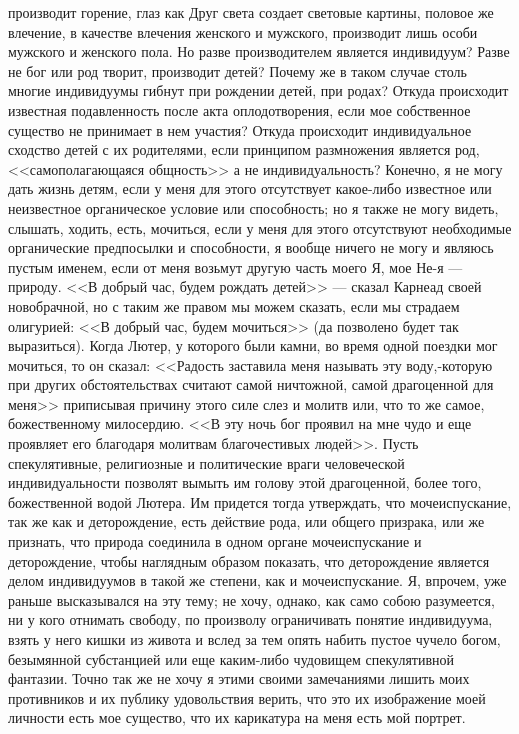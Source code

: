 \documentclass[12pt]{article}
\begin{document}
производит горение, глаз как Друг света создает световые картины, половое же влечение, в качестве влечения женского и мужского, производит лишь особи мужского и женского пола. Но разве производителем является индивидуум? Разве не бог или род творит, производит детей? Почему же в таком случае столь многие индивидуумы гибнут при рождении детей, при родах? Откуда происходит известная подавленность после акта оплодотворения, если мое собственное существо не принимает в нем участия? Откуда происходит индивидуальное сходство детей с их родителями, если принципом размножения является род, <<самополагающаяся общность>>  а не индивидуальность? Конечно, я не могу дать жизнь детям, если у меня для этого отсутствует какое-либо известное или неизвестное органическое условие или способность; но я также не могу видеть, слышать, ходить, есть, мочиться, если у меня для этого отсутствуют необходимые органические предпосылки и способности, я вообще ничего не могу и являюсь пустым именем, если от меня возьмут другую часть моего Я, мое Не-я --- природу. <<В добрый час, будем рождать детей>>  --- сказал Карнеад своей новобрачной, но с таким же правом мы можем сказать, если мы страдаем олигурией: <<В добрый час, будем мочиться>> (да позволено будет так выразиться). Когда Лютер, у которого были камни, во время одной поездки мог мочиться, то он сказал: <<Радость заставила меня называть эту воду,-которую при других обстоятельствах считают самой ничтожной, самой драгоценной для меня>>  приписывая причину этого силе слез и молитв или, что то же самое, божественному милосердию. <<В эту ночь бог проявил на мне чудо и еще проявляет его благодаря молитвам благочестивых людей>>. Пусть спекулятивные, религиозные и политические враги человеческой индивидуальности позволят вымыть им голову этой драгоценной, более того, божественной водой Лютера. Им придется тогда утверждать, что мочеиспускание, так же как и деторождение, есть действие рода, или общего призрака, или же признать, что природа соединила в одном органе мочеиспускание и деторождение, чтобы наглядным образом показать, что деторождение является делом индивидуумов в такой же степени, как и мочеиспускание. Я, впрочем, уже раньше высказывался на эту тему; не хочу, однако, как само собою разумеется, ни у кого отнимать свободу, по произволу ограничивать понятие индивидуума, взять у него кишки из живота и вслед за тем опять набить пустое чучело богом, безымянной субстанцией или еще каким-либо чудовищем спекулятивной фантазии. Точно так же не хочу я этими своими замечаниями лишить моих противников и их публику удовольствия верить, что это их изображение моей личности есть мое существо, что их карикатура на меня есть мой портрет. 
\end{document}
